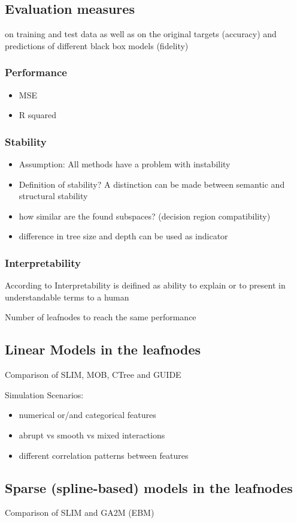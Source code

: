 \subsection{Evaluation measures}
on training and test data as well as on the original targets (accuracy) and predictions of different black box models (fidelity)
\subsubsection{Performance}
\begin{itemize}
    \item MSE
    \item R squared
\end{itemize}

\subsubsection{Stability}
\begin{itemize}
    \item Assumption: All methods have a problem with instability \citep{Fokkema.2020}
    \item Definition of stability? A distinction can be made between semantic and structural stability \citep{Wang.2018}
    \item how similar are the found subspaces? (decision region compatibility) \citep{Wang.2018}

    \item difference in tree size and depth can be used as indicator \citep{Wang.2018}


\end{itemize}






\subsubsection{Interpretability}
According to \citet{DoshiVelez.2017} Interpretability is deifined as ability to explain or to present in understandable
terms to a human

Number of leafnodes to reach the same performance

\subsection{Linear Models in the leafnodes}
Comparison of SLIM, MOB, CTree and GUIDE

Simulation Scenarios:
\begin{itemize}
    \item numerical or/and categorical features
    \item abrupt vs smooth vs mixed interactions
    \item different correlation patterns between features
\end{itemize}


\subsection{Sparse (spline-based) models in the leafnodes}
Comparison of SLIM and GA2M (EBM)